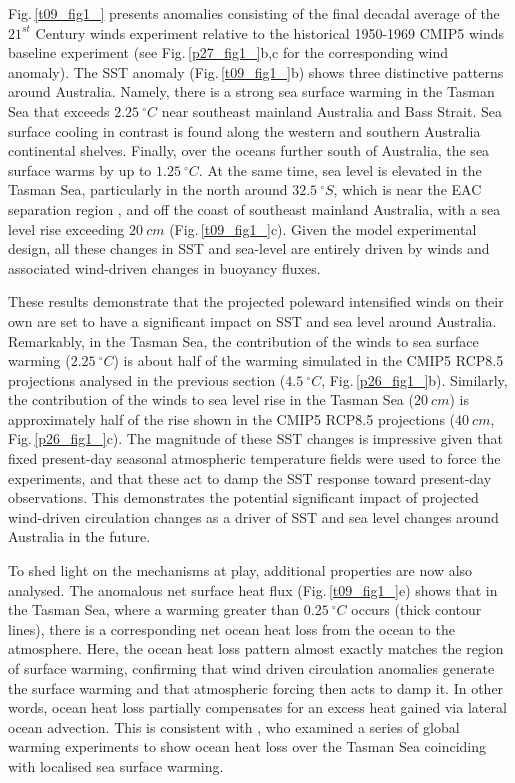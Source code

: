 \documentclass[draft,linenumbers]{agujournal2018}
\begin{document}
Fig.\,\ref{t09_fig1_} presents anomalies consisting of the final decadal average of the $21^{st}$ Century winds experiment relative to the historical 1950-1969 CMIP5 winds baseline experiment (see Fig.\,\ref{p27_fig1_}b,c for the corresponding wind anomaly). The SST anomaly (Fig.\,\ref{t09_fig1_}b) shows three distinctive patterns around Australia. Namely, there is a strong sea surface warming in the Tasman Sea that exceeds $2.25\ ^{\circ}C$ near southeast mainland Australia and Bass Strait. Sea surface cooling in contrast is found along the western and southern Australia continental shelves. Finally, over the oceans further south of Australia, the sea surface warms by up to $1.25\ ^{\circ}C$. At the same time, sea level is elevated in the Tasman Sea, particularly in the north around $32.5\ ^{\circ}S$, which is near the EAC separation region \citep{Godfrey1980}, and off the coast of southeast mainland Australia, with a sea level rise exceeding $20\ cm$ (Fig.\,\ref{t09_fig1_}c). Given the model experimental design, all these changes in SST and sea-level are entirely driven by winds and associated wind-driven changes in buoyancy fluxes.

These results demonstrate that the projected poleward intensified winds on their own are set to have a significant impact on SST and sea level around Australia. Remarkably, in the Tasman Sea, the contribution of the winds to sea surface warming ($2.25\ ^{\circ}C$) is about half of the warming simulated in the CMIP5 RCP8.5 projections analysed in the previous section ($4.5\ ^{\circ}C$, Fig.\,\ref{p26_fig1_}b). Similarly, the contribution of the winds to sea level rise in the Tasman Sea ($20\ cm$) is approximately half of the rise shown in the CMIP5 RCP8.5 projections ($40\ cm$, Fig.\,\ref{p26_fig1_}c). The magnitude of these SST changes is impressive given that fixed present-day seasonal atmospheric temperature fields were used to force the experiments, and that these act to damp the SST response toward present-day observations. This demonstrates the potential significant impact of projected wind-driven circulation changes as a driver of SST and sea level changes around Australia in the future.

To shed light on the mechanisms at play, additional properties are now also analysed. The anomalous net surface heat flux (Fig.\,\ref{t09_fig1_}e) shows that in the Tasman Sea, where a warming greater than $0.25\ ^{\circ}C$ occurs (thick contour lines), there is a corresponding net ocean heat loss from the ocean to the atmosphere. Here, the ocean heat loss pattern almost exactly matches the region of surface warming, confirming that wind driven circulation anomalies generate the surface warming and that atmospheric forcing then acts to damp it. In other words, ocean heat loss partially compensates for an excess heat gained via lateral ocean advection. This is consistent with \citet{Cai2005}, who examined a series of global warming experiments to show ocean heat loss over the Tasman Sea coinciding with localised sea surface warming. 
\end{document}

